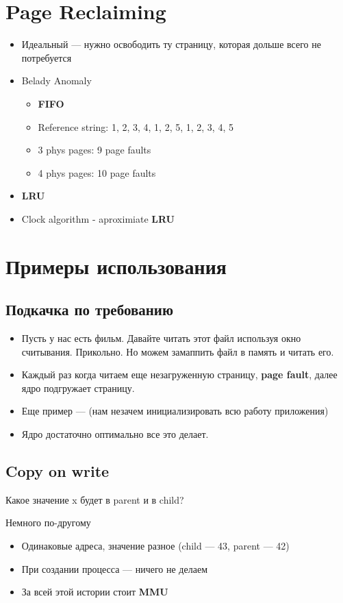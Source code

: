 \documentclass[../../lectures.tex]{subfiles}
\begin{document}
\section{Page Reclaiming}
\begin{itemize}
    \item Идеальный --- нужно освободить ту страницу, которая дольше всего не потребуется
    \item Belady Anomaly
          \begin{itemize}
            \item \textbf{FIFO}
            \item Reference string: 1, 2, 3, 4, 1, 2, 5, 1, 2, 3, 4, 5
            \item 3 phys pages: 9 page faults
            \item 4 phys pages: 10 page faults
          \end{itemize}
    \item \textbf{LRU}
    \item Clock algorithm - aproximiate \textbf{LRU}
\end{itemize}

\section{Примеры использования}
\subsection{Подкачка по требованию}
\begin{itemize}
    \item Пусть у нас есть фильм. Давайте читать этот файл используя
          окно считывания. Прикольно. Но можем замаппить файл в память 
          и читать его.
    \item Каждый раз когда читаем еще незагруженную страницу, \textbf{page fault},
          далее ядро подгружает страницу.
    \item Еще пример ---  (нам незачем инициализировать всю работу приложения)
    \item Ядро достаточно оптимально все это делает.
\end{itemize}
\subsection{Copy on write}
Какое значение x будет в parent и в child?

Немного по-другому
\begin{itemize}
    \item Одинаковые адреса, значение разное (child --- 43, parent --- 42)
    \item При создании процесса --- ничего не делаем
    \item За всей этой истории стоит \textbf{MMU}
\end{itemize}
\end{document}

